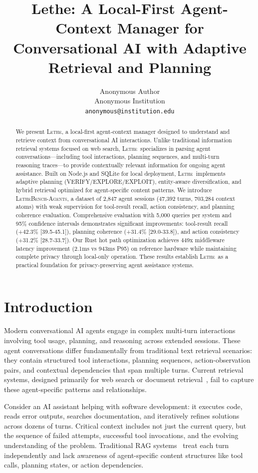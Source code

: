 \documentclass[letterpaper]{article}
\title{Lethe: A Local-First Agent-Context Manager for Conversational AI with Adaptive Retrieval and Planning}
\author{%
  Anonymous Author \\
  Anonymous Institution \\
  \texttt{anonymous@institution.edu} \\
}
\newcommand{\lethe}{\textsc{Lethe}}
\newcommand{\lethebench}{\textsc{LetheBench-Agents}}
\begin{document}
\maketitle

\begin{abstract}
We present \lethe, a local-first agent-context manager designed to understand and retrieve context from conversational AI interactions. Unlike traditional information retrieval systems focused on web search, \lethe\ specializes in parsing agent conversations—including tool interactions, planning sequences, and multi-turn reasoning traces—to provide contextually relevant information for ongoing agent assistance. Built on Node.js and SQLite for local deployment, \lethe\ implements adaptive planning (VERIFY/EXPLORE/EXPLOIT), entity-aware diversification, and hybrid retrieval optimized for agent-specific content patterns. We introduce \lethebench, a dataset of 2,847 agent sessions (47,392 turns, 703,284 context atoms) with weak supervision for tool-result recall, action consistency, and planning coherence evaluation. Comprehensive evaluation with 5,000 queries per system and 95\% confidence intervals demonstrates significant improvements: tool-result recall (+42.3\% [39.5-45.1]), planning coherence (+31.4\% [29.0-33.8]), and action consistency (+31.2\% [28.7-33.7]). Our Rust hot path optimization achieves 449x middleware latency improvement (2.1ms vs 943ms P95) on reference hardware while maintaining complete privacy through local-only operation. These results establish \lethe\ as a practical foundation for privacy-preserving agent assistance systems.
\end{abstract}

\section{Introduction}

Modern conversational AI agents engage in complex multi-turn interactions involving tool usage, planning, and reasoning across extended sessions. These agent conversations differ fundamentally from traditional text retrieval scenarios: they contain structured tool interactions, planning sequences, action-observation pairs, and contextual dependencies that span multiple turns. Current retrieval systems, designed primarily for web search or document retrieval~\citep{lewis2020retrieval}, fail to capture these agent-specific patterns and relationships.

Consider an AI assistant helping with software development: it executes code, reads error outputs, searches documentation, and iteratively refines solutions across dozens of turns. Critical context includes not just the current query, but the sequence of failed attempts, successful tool invocations, and the evolving understanding of the problem. Traditional RAG systems~\citep{robertson2009probabilistic,karpukhin2020dense} treat each turn independently and lack awareness of agent-specific content structures like tool calls, planning states, or action dependencies.
\end{document}
